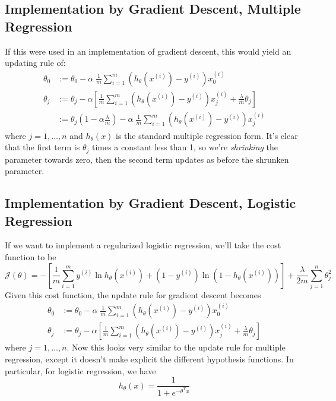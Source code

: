 \documentclass[12pt]{article}
\begin{document}
\subsection{Implementation by Gradient Descent, Multiple
Regression}

If this were used in an implementation of gradient descent, this
would yield an updating rule of:
\begin{align*}
   \theta_0 &:= \theta_0 - \alpha \; \frac{1}{m} \sum^m_{i=1}
   \left( h_\theta(x^{(i)})-y^{(i)}\right) x_0^{(i)}\\
   \theta_j &:= \theta_j - \alpha \left[ \frac{1}{m} \sum^m_{i=1}
   \left( h_\theta(x^{(i)})-y^{(i)}\right) x_j^{(i)} +
   \frac{\lambda}{m} \theta_j \right]\\
   &:= \theta_j\left(1-\alpha \frac{\lambda}{m}\right) - \alpha \;
   \frac{1}{m} \sum^m_{i=1}
   \left( h_\theta(x^{(i)})-y^{(i)}\right) x_j^{(i)}
\end{align*}
where $j=1, \ldots, n$ and $h_\theta(x)$ is the standard
multiple regression form.
It's clear that the first term is $\theta_j$
times a constant less than 1, so we're \emph{shrinking} the
parameter towards zero, then the second term updates as before the
shrunken parameter.


\subsection{Implementation by Gradient Descent, Logistic
Regression}

If we want to implement a regularized logistic regression, we'll take
the cost function to be
\begin{equation}
   \label{logreg}
   \mathcal{J}(\theta) = -\left[\frac{1}{m} \sum_{i=1}^m
   y^{(i)} \ln h_\theta(x^{(i)}) + (1-y^{(i)}) \ln \left(1-
   h_\theta(x^{(i)})\right)\right] + \frac{\lambda}{2m} \sum^n_{j=1}
   \theta_j^2
\end{equation}
Given this cost function, the update rule for gradient descent
becomes
\begin{align*}
   \theta_0 &:= \theta_0 - \alpha \; \frac{1}{m} \sum^m_{i=1}
   \left( h_\theta(x^{(i)})-y^{(i)}\right) x_0^{(i)}\\
   \theta_j &:=
      \theta_j - \alpha \left[ \frac{1}{m} \sum^m_{i=1}
      \left( h_\theta(x^{(i)})-y^{(i)}\right) x_j^{(i)} +
      \frac{\lambda}{m} \theta_j \right]
\end{align*}
where $j=1,\ldots,n$.  Now this looks very similar to the update
rule for multiple regression, except it doesn't make explicit
the different hypothesis functions.  In particular, for logistic
regression, we have
\[ h_\theta(x) = \frac{1}{1 + e^{-\theta^T x}} \]
\end{document}
